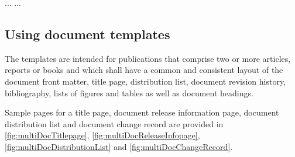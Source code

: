 \begin{CommandLineListing}
{   }
   \uppertitleback{%
   }
   \lowertitleback{%
   }
   ...
   ...
\end{CommandLineListing}



\subsection[The \multidoc document templates]{Using \multidoc document templates}
\label{subsec:usingMultiDocumentTemplates}

The \multidoc templates are intended for publications that comprise two or
more articles, reports or books and which shall have a common and
consistent layout of the document front matter, \EG{} title page,
distribution list, document revision history, bibliography, lists of
figures and tables as well as document headings.

Sample pages for a \multidoc title page, document release information page,
document distribution list and document change record are provided in
\autoref{fig:multiDocTitlepage}, \autoref{fig:multiDocReleaseInfopage},
\autoref{fig:multiDocDistributionList} and
\autoref{fig:multiDocChangeRecord}.

